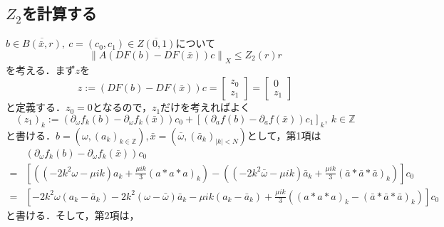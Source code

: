\documentclass[11pt,a4paper,titlepage]{jsreport}
\theoremstyle{definition}
\begin{document}
\subsection{$Z_2$を計算する}
$b \in \overline{B\left(\bar{x},r\right)},\ c=\left(c_0,c_1\right)\in\overline{Z(0,1)}$について
\begin{equation*}
  \left\| A \left( DF \left( b \right) - DF \left( \bar{x} \right) \right) c \right\|_X \leq Z_2(r)r
\end{equation*}
を考える．まず$z$を
\begin{equation*}
  z := \left( DF(b) - DF(\bar{x}) \right) c = \begin{bmatrix}
    z_0 \\
    z_1
  \end{bmatrix}
  = \begin{bmatrix}
    0 \\
    z_1
  \end{bmatrix}
\end{equation*}
と定義する．$z_0=0$となるので，$z_1$だけを考えればよく
\begin{equation*}
  \left(z_1\right)_k := \left(\partial_\omega f_k \left(b\right) - \partial_\omega f_k \left(\bar{x}\right) \right)c_0 + \left[ \left(\partial_a f\left(b\right) - \partial_a f \left(\bar{x}\right) \right) c_1 \right]_k,\ k \in \mathbb{Z}
\end{equation*}
と書ける．$b=\left( \omega, \left(a_k\right)_{k\in\mathbb{Z}} \right), \bar{x}=\left( \bar{\omega}, \left(\bar{a}_k\right)_{|k|<N} \right)$として，第1項は
\begin{equation*}
  \begin{split}
    &\left(\partial_\omega f_k \left(b\right) - \partial_\omega f_k \left(\bar{x}\right) \right)c_0 \\
    =& \left[ \left( \left( -2k^2\omega - \mu ik \right) a_k + \frac{\mu ik}{3} \left( a*a*a \right)_k \right) - \left( \left( -2k^2\bar{\omega} - \mu ik \right) \bar{a}_k       + \frac{\mu ik}{3} \left( \bar{a}*\bar{a}*\bar{a} \right)_k \right) \right]c_0 \\
    =& \left[  -2k^2\omega \left( a_k - \bar{a}_k \right) -2k^2\left( \omega - \bar{\omega} \right)\bar{a}_k - \mu ik \left( a_k - \bar{a}_k \right) + \frac{\mu ik}{3} \left( \left( a*a*a \right)_k - \left(\bar{a}*\bar{a}*\bar{a}\right)_k \right) \right] c_0
  \end{split}
\end{equation*}
と書ける．そして，第2項は，
\end{document}
